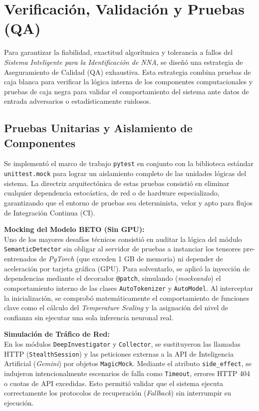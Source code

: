 
\section{Verificación, Validación y Pruebas (QA)}
\label{sec:qa_pruebas}

Para garantizar la fiabilidad, exactitud algorítmica y tolerancia a fallos del \textit{Sistema Inteligente para la Identificación de NNA}, se diseñó una estrategia de Aseguramiento de Calidad (QA) exhaustiva. Esta estrategia combina pruebas de caja blanca para verificar la lógica interna de los componentes computacionales y pruebas de caja negra para validar el comportamiento del sistema ante datos de entrada adversarios o estadísticamente ruidosos.

\subsection{Pruebas Unitarias y Aislamiento de Componentes}
\label{subsec:pruebas_unitarias}

Se implementó el marco de trabajo \texttt{pytest} en conjunto con la biblioteca estándar \texttt{unittest.mock} para lograr un aislamiento completo de las unidades lógicas del sistema. La directriz arquitectónica de estas pruebas consistió en eliminar cualquier dependencia estocástica, de red o de hardware especializado, garantizando que el entorno de pruebas sea determinista, veloz y apto para flujos de Integración Continua (CI).

\textbf{Mocking del Modelo BETO (Sin GPU):} \\
Uno de los mayores desafíos técnicos consistió en auditar la lógica del módulo \texttt{SemanticDetector} sin obligar al servidor de pruebas a instanciar los tensores pre-entrenados de \textit{PyTorch} (que exceden 1 GB de memoria) ni depender de aceleración por tarjeta gráfica (GPU). Para solventarlo, se aplicó la inyección de dependencias mediante el decorador \texttt{@patch}, simulando (\textit{mockeando}) el comportamiento interno de las clases \texttt{AutoTokenizer} y \texttt{AutoModel}. Al interceptar la inicialización, se comprobó matemáticamente el comportamiento de funciones clave como el cálculo del \textit{Temperature Scaling} y la asignación del nivel de confianza sin ejecutar una sola inferencia neuronal real.

\textbf{Simulación de Tráfico de Red:} \\
En los módulos \texttt{DeepInvestigator} y \texttt{Collector}, se sustituyeron las llamadas HTTP (\texttt{StealthSession}) y las peticiones externas a la API de Inteligencia Artificial (\textit{Gemini}) por objetos \texttt{MagicMock}. Mediante el atributo \texttt{side\_effect}, se indujeron intencionalmente escenarios de falla como \texttt{Timeout}, errores HTTP 404 o cuotas de API excedidas. Esto permitió validar que el sistema ejecuta correctamente los protocolos de recuperación (\textit{Fallback}) sin interrumpir su ejecución.

